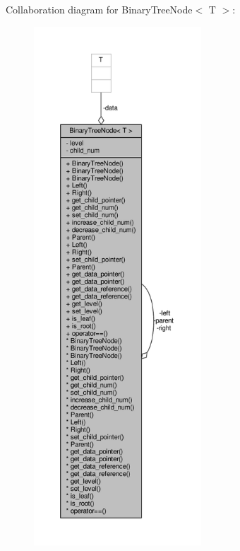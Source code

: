 Collaboration diagram for Binary\+Tree\+Node$<$ T $>$\+:\nopagebreak
\begin{figure}[H]
\begin{center}
\leavevmode
\includegraphics[height=550pt]{classBinaryTreeNode__coll__graph}
\end{center}
\end{figure}
